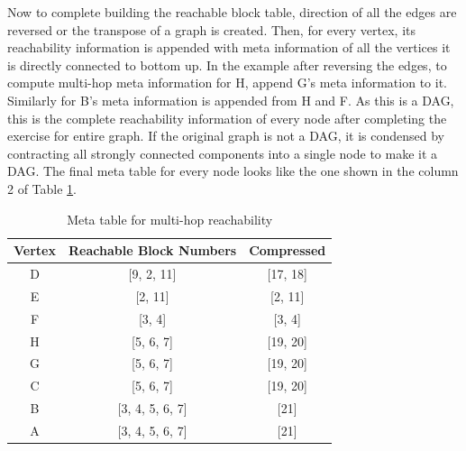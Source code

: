

Now to complete building the reachable block table, direction of all the edges are reversed or the transpose of a graph is created. Then, for every vertex, its reachability information is appended with meta information of all the vertices it is directly connected to bottom up. In the example after reversing the edges, to compute multi-hop meta information for H, append G's meta information to it. Similarly for B's meta information is appended from H and F. As this is a DAG, this is the complete reachability information of every node after completing the exercise for entire graph. If the original graph is not a DAG, it is condensed by contracting all strongly connected components into a single node to make it a DAG. The final meta table for every node looks like the one shown in the column 2 of Table \ref{tab:multi-hop-meta}.

\begin{table}[h]
	\caption{Meta table for multi-hop reachability}
	\label{tab:multi-hop-meta}
	\begin{center}
		\renewcommand{\arraystretch}{1.25}
		\begin{tabular}{ c | c | c }
			\hline
			Vertex & Reachable Block Numbers & Compressed\\ \hline
			\hline
			D & [9, 2, 11] & [17, 18] \\
			E & [2, 11] & [2, 11] \\
			F & [3, 4] & [3, 4] \\
			H & [5, 6, 7] & [19, 20] \\
			G & [5, 6, 7] & [19, 20] \\
			C & [5, 6, 7] & [19, 20] \\
			B & [3, 4, 5, 6, 7] & [21] \\
			A & [3, 4, 5, 6, 7] & [21] \\
			\hline
		\end{tabular}
	\end{center}
\end{table}

